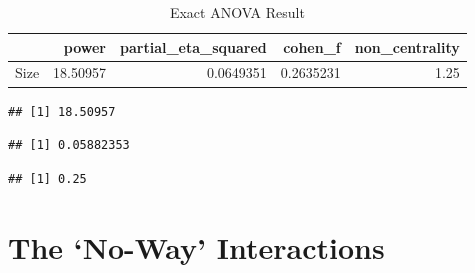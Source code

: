 \documentclass[
]{book}
\newenvironment{Shaded}{\begin{snugshade}}{\end{snugshade}}
\newcommand{\CommentTok}[1]{\textcolor[rgb]{0.56,0.35,0.01}{\textit{#1}}}
\newcommand{\DecValTok}[1]{\textcolor[rgb]{0.00,0.00,0.81}{#1}}
\newcommand{\KeywordTok}[1]{\textcolor[rgb]{0.13,0.29,0.53}{\textbf{#1}}}
\newcommand{\NormalTok}[1]{#1}
\newcommand{\OperatorTok}[1]{\textcolor[rgb]{0.81,0.36,0.00}{\textbf{#1}}}
\newcommand{\StringTok}[1]{\textcolor[rgb]{0.31,0.60,0.02}{#1}}
\begin{document}
\begin{table}[!h]

\caption{\label{tab:unnamed-chunk-197}Exact ANOVA Result}
\centering
\begin{tabular}[t]{l|r|r|r|r}
\hline
  & power & partial\_eta\_squared & cohen\_f & non\_centrality\\
\hline
Size & 18.50957 & 0.0649351 & 0.2635231 & 1.25\\
\hline
\end{tabular}
\end{table}

\begin{Shaded}
\end{Shaded}

\begin{verbatim}
## [1] 18.50957
\end{verbatim}

\begin{Shaded}
\end{Shaded}

\begin{verbatim}
## [1] 0.05882353
\end{verbatim}

\begin{Shaded}
\end{Shaded}

\begin{verbatim}
## [1] 0.25
\end{verbatim}

\hypertarget{the-no-way-interactions}{%
\chapter{The `No-Way' Interactions}\label{the-no-way-interactions}}
\end{document}
